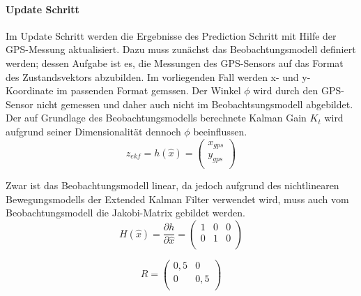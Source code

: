\documentclass[11pt]{article}
\begin{document}
\paragraph{Update Schritt}
Im Update Schritt werden die Ergebnisse des Prediction Schritt mit Hilfe der GPS-Messung aktualisiert. Dazu muss zunächst das Beobachtungsmodell definiert werden; dessen Aufgabe ist es, die Messungen des GPS-Sensors auf das Format des Zustandsvektors abzubilden. Im vorliegenden Fall werden x- und y-Koordinate im passenden Format gemssen. Der Winkel $\phi$ wird durch den GPS-Sensor nicht gemessen und daher auch nicht im Beobachtsungsmodell abgebildet. Der auf Grundlage des Beobachtungsmodells berechnete Kalman Gain $K_t$ wird aufgrund seiner Dimensionalität dennoch $\phi$ beeinflussen.
\begin{equation}\label{EKF-Observation-Model}
	z_{ekf} = h(\hat{x}) = \begin{pmatrix}
		x_{gps} \\
		y_{gps} \\
	\end{pmatrix}
\end{equation}

Zwar ist das Beobachtungsmodell linear, da jedoch aufgrund des nichtlinearen Bewegungsmodells der Extended Kalman Filter verwendet wird, muss auch vom Beobachtungsmodell die Jakobi-Matrix gebildet werden.
\begin{equation}\label{EKF-Observation-Model-Jakobi-Matrix}
	H(\hat{x})= \frac{\partial h}{\partial \hat{x}} = \begin{pmatrix}
		1 & 0 & 0 \\
		0 & 1 & 0 \\
	\end{pmatrix}
\end{equation}

\begin{equation}\label{GPS-Messungenauigkeits-Matrix}
	R = \begin{pmatrix}
		0,5 & 0 \\
		0 & 0,5 \\
	\end{pmatrix}
\end{equation}
\end{document}
